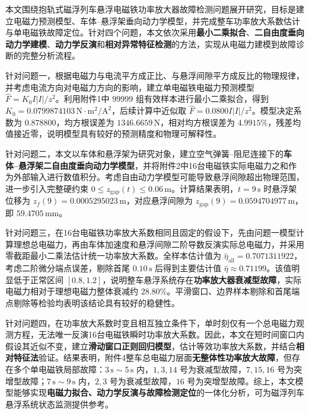 


本文围绕抱轨式磁浮列车悬浮电磁铁功率放大器故障检测问题展开研究，目标是建立电磁力预测模型、车体--悬浮架垂向动力学模型，并完成整车功率放大系数估计与单电磁铁故障定位。针对四个问题，本文依次采用\textbf{最小二乘拟合}、\textbf{二自由度垂向动力学建模}、\textbf{动力学反演}和\textbf{相对异常特征检测}的方法，实现从电磁力建模到故障诊断的完整分析流程。

针对问题一，根据电磁力与电流平方成正比、与悬浮间隙平方成反比的物理规律，并考虑电流方向对电磁力方向的影响，建立单电磁铁电磁力预测模型
$\hat F=K_0I|I|/z^2$。利用附件1中 $99999$ 组有效样本进行最小二乘拟合，得到 $K_0=0.0799874103\,\mathrm{N\cdot m^2/A^2}$，后续计算中近似取 $\hat F=0.0800I|I|/z^2$。模型决定系数为 $0.878800$，均方根误差为 $1346.6659\,\mathrm{N}$，相对均方根误差为 $4.9915\%$，残差均值接近零，说明模型具有较好的预测精度和物理可解释性。

针对问题二，本文以车体和悬浮架为研究对象，建立空气弹簧--阻尼连接下的\textbf{车体--悬浮架二自由度垂向动力学模型}，并将附件2中16台电磁铁实际电磁力之和作为外部输入进行数值积分。考虑自由动力学模型可能导致悬浮间隙超出物理范围，进一步引入完整硬约束 $0\leq z_{\mathrm{gap}}(t)\leq0.06\,\mathrm{m}$。计算结果表明，$t=9\,\mathrm{s}$ 时悬浮架位移为 $z_f(9)=0.0005295023\,\mathrm{m}$，对应悬浮间隙为 $z_{\mathrm{gap}}(9)=0.0594704977\,\mathrm{m}$，即 $59.4705\,\mathrm{mm}$。

针对问题三，在16台电磁铁功率放大系数相同且固定的假设下，先由问题一模型计算理想总电磁力，再由车体加速度和悬浮间隙二阶导数反演实际总电磁力，并采用零截距最小二乘法估计统一功率放大系数。全样本估计值为 $\hat{\eta}_{\mathrm{all}}=0.7071311922$，考虑二阶微分端点误差，剔除首尾 $0.10\,\mathrm{s}$ 后得到主要估计值 $\hat{\eta}\approx0.71199$。该值明显低于正常区间 $[0.8,1.2]$，说明整车悬浮系统存在\textbf{功率放大器衰减型故障}，实际电磁力相对于理想电磁力整体衰减约 $28.80\%$。平滑窗口、边界样本剔除和首尾端点剔除等检验均表明该结论具有较好的稳健性。

针对问题四，在功率放大系数时变且相互独立条件下，单时刻仅有一个总电磁力观测方程，无法唯一反演16台电磁铁瞬时功率放大系数。因此，本文在短时间窗口内假设其近似不变，建立\textbf{滑动窗口正则回归模型}，估计等效功率放大系数，并结合\textbf{相对特征法}验证。结果表明，附件4整车总电磁力层面\textbf{无整体性功率放大故障}，但存在多个单电磁铁局部故障：$3\,\mathrm{s}\sim5\,\mathrm{s}$ 内，$1,3,14$ 号为衰减型故障，$7,15,16$ 号为突增型故障；$7\,\mathrm{s}\sim9\,\mathrm{s}$ 内，$2,3$ 号为衰减型故障，$16$ 号为突增型故障。综上，本文模型能够实现\textbf{电磁力拟合、动力学反演与故障检测定位}的一体化分析，可为磁浮列车悬浮系统状态监测提供参考。


 

